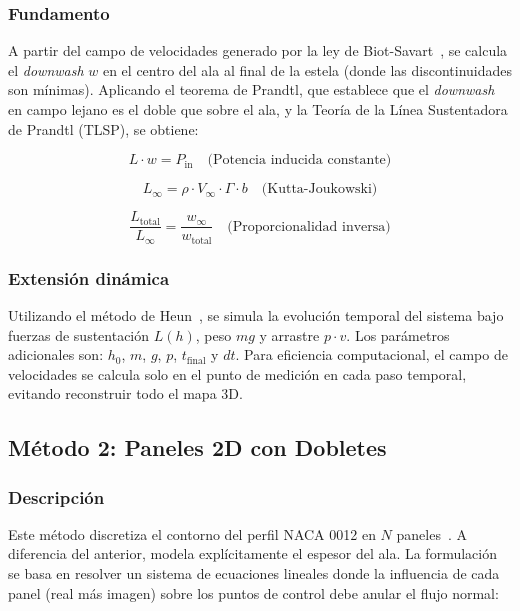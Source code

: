 \documentclass[twocolumn]{article}
\begin{document}
\subsubsection{Fundamento}

A partir del campo de velocidades generado por la ley de Biot-Savart~\cite{prandtl1921}, se calcula el \textit{downwash} $w$ en el centro del ala al final de la estela (donde las discontinuidades son mínimas). Aplicando el teorema de Prandtl, que establece que el \textit{downwash} en campo lejano es el doble que sobre el ala, y la Teoría de la Línea Sustentadora de Prandtl (TLSP), se obtiene:

\begin{equation}
    L \cdot w = P_{\text{in}} \quad \text{(Potencia inducida constante)}
\end{equation}

\begin{equation}
   L_{\infty} = \rho \cdot V_{\infty} \cdot \Gamma \cdot b \quad \text{(Kutta-Joukowski)}
\end{equation}

\begin{equation}
    \frac{L_{\text{total}}}{L_{\infty}} = \frac{w_{\infty}}{w_{\text{total}}} \quad \text{(Proporcionalidad inversa)}
\end{equation}

\subsubsection{Extensión dinámica}

Utilizando el método de Heun~\cite{burden2015}, se simula la evolución temporal del sistema bajo fuerzas de sustentación $L(h)$, peso $mg$ y arrastre $p \cdot v$. Los parámetros adicionales son: $h_0$, $m$, $g$, $p$, $t_{\text{final}}$ y $dt$. Para eficiencia computacional, el campo de velocidades se calcula solo en el punto de medición en cada paso temporal, evitando reconstruir todo el mapa 3D.

\subsection{Método 2: Paneles 2D con Dobletes}

\subsubsection{Descripción}
Este método discretiza el contorno del perfil NACA 0012 en $N$ paneles~\cite{hess1967}. A diferencia del anterior, modela explícitamente el espesor del ala. La formulación se basa en resolver un sistema de ecuaciones lineales donde la influencia de cada panel (real más imagen) sobre los puntos de control debe anular el flujo normal:
\end{document}
